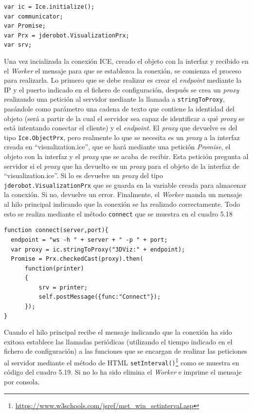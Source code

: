 \begin{lstlisting}[caption= Código para la inicialización de la conexión ICE, label=cod.inicializarice]
var ic = Ice.initialize();
var communicator;
var Promise;
var Prx = jderobot.VisualizationPrx;
var srv;
\end{lstlisting}

Una vez incializada la conexión ICE, creado el objeto con la interfaz y recibido en el \textit{Worker} el mensaje para que se establezca la conexión, se comienza el proceso para realizarla. Lo primero que se debe realizar es crear el \textit{endpoint} mediante la IP y el puerto indicado en el fichero de configuración, después se crea un \textit{proxy} realizando una petición al servidor mediante la llamada a \texttt{stringToProxy}, pasándole como parámetro una cadena de texto que contiene la identidad del objeto (será a partir de la cual el servidor sea capaz de identificar a qué \textit{proxy} se está intentando conectar el cliente) y el \textit{endpoint}. El \textit{proxy} que devuelve es del tipo \texttt{Ice.ObjectPrx}, pero realmente lo que se necesita es un \textit{proxy} a la interfaz creada en ``visualization.ice'', que se hará mediante una petición \textit{Promise}, el objeto con la interfaz y el \textit{proxy} que se acaba de recibir. Esta petición pregunta al servidor si el \textit{proxy} que ha devuelto es un \textit{proxy} para el objeto de la interfaz de ``visualization.ice''. Si lo es devuelve un \textit{proxy} del tipo \texttt{jderobot.VisualizationPrx} que se guarda en la variable creada para almacenar la conexión. Si no, devuelve un error.  Finalmente, el \textit{Worker} manda un mensaje al hilo principal indicando que la conexión se ha realizado correctamente. Todo esto se realiza mediante el método \texttt{connect} que se muestra en el cuadro 5.18

\begin{lstlisting}[caption= Código para realizar la conexión ICE, label=cod.conexionice]
function connect(server,port){
  endpoint = "ws -h " + server + " -p " + port;
  var proxy = ic.stringToProxy("3DViz:" + endpoint);
  Promise = Prx.checkedCast(proxy).then(
      function(printer)
      {
          srv = printer;
          self.postMessage({func:"Connect"});
      });
}
\end{lstlisting}

Cuando el hilo principal recibe el mensaje indicando que la conexión ha sido exitosa establece las llamadas periódicas (utilizando el tiempo indicado en el fichero de configuración) a las funciones que se encargan de realizar las peticiones al servidor mediante el método de HTML \texttt{setInterval()}\footnote{\url{https://www.w3schools.com/jsref/met_win_setinterval.asp}} como se muestra en código del cuadro 5.19. Si no lo ha sido elimina el \textit{Worker} e imprime el mensaje por consola. 

